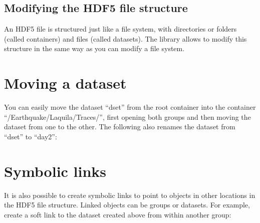 \documentclass[letterpaper,10pt,english]{sphinxmanual}
\begin{document}
\section{Modifying the HDF5 file structure}
\label{\detokenize{index:modifying-the-hdf5-file-structure}}
\sphinxAtStartPar
An HDF5 file is structured just like a file system, with directories or folders (called containers) and files (called datasets).
The library allows to modify this structure in the same way as you can modify a file system.


\chapter{Moving a dataset}
\label{\detokenize{index:moving-a-dataset}}
\sphinxAtStartPar
You can easily move the dataset “dset” from the root container into the container “/Earthquake/Laquila/Traces/”,
first opening both groups and then moving the dataset from one to the other.
The following also renames the dataset from “dset” to “day2”:

\begin{sphinxVerbatim}[commandchars=\\\{\}]
    
    

     
\end{sphinxVerbatim}


\chapter{Symbolic links}
\label{\detokenize{index:symbolic-links}}
\sphinxAtStartPar
It is also possible to create symbolic links to point to objects in other locations in the HDF5 file structure.
Linked objects can be groups or datasets.
For example, create a soft link to the dataset created above from within another group:
\end{document}
